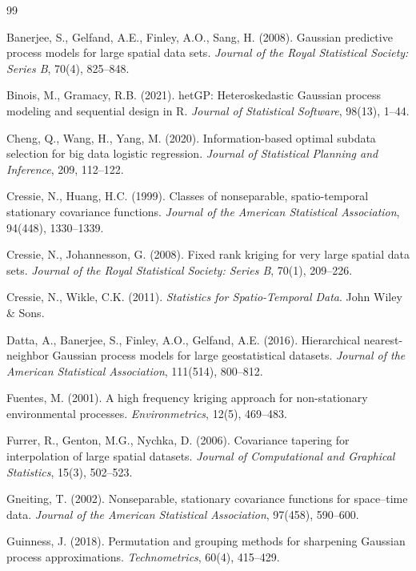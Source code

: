 \documentclass[12pt, a4paper]{article}
\begin{document}
\begin{thebibliography}{99}

Banerjee, S., Gelfand, A.E., Finley, A.O., Sang, H. (2008).
Gaussian predictive process models for large spatial data sets.
\textit{Journal of the Royal Statistical Society: Series B}, 70(4), 825--848.

Binois, M., Gramacy, R.B. (2021).
hetGP: Heteroskedastic Gaussian process modeling and sequential design in R.
\textit{Journal of Statistical Software}, 98(13), 1--44.

Cheng, Q., Wang, H., Yang, M. (2020).
Information-based optimal subdata selection for big data logistic regression.
\textit{Journal of Statistical Planning and Inference}, 209, 112--122.

Cressie, N., Huang, H.C. (1999).
Classes of nonseparable, spatio-temporal stationary covariance functions.
\textit{Journal of the American Statistical Association}, 94(448), 1330--1339.

Cressie, N., Johannesson, G. (2008).
Fixed rank kriging for very large spatial data sets.
\textit{Journal of the Royal Statistical Society: Series B}, 70(1), 209--226.

Cressie, N., Wikle, C.K. (2011).
\textit{Statistics for Spatio-Temporal Data}.
John Wiley \& Sons.

Datta, A., Banerjee, S., Finley, A.O., Gelfand, A.E. (2016).
Hierarchical nearest-neighbor Gaussian process models for large geostatistical datasets.
\textit{Journal of the American Statistical Association}, 111(514), 800--812.

Fuentes, M. (2001).
A high frequency kriging approach for non-stationary environmental processes.
\textit{Environmetrics}, 12(5), 469--483.

Furrer, R., Genton, M.G., Nychka, D. (2006).
Covariance tapering for interpolation of large spatial datasets.
\textit{Journal of Computational and Graphical Statistics}, 15(3), 502--523.

Gneiting, T. (2002).
Nonseparable, stationary covariance functions for space--time data.
\textit{Journal of the American Statistical Association}, 97(458), 590--600.

Guinness, J. (2018).
Permutation and grouping methods for sharpening Gaussian process approximations.
\textit{Technometrics}, 60(4), 415--429.


\end{thebibliography}
\end{document}
